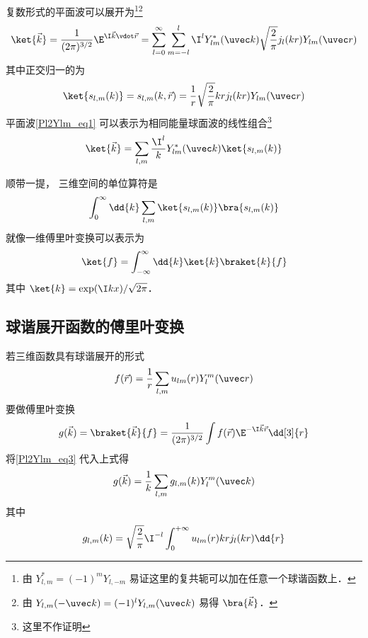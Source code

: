 

复数形式的平面波可以展开为\footnote{由 $Y_{l,m}^* = (-1)^m Y_{l,-m}$ 易证这里的复共轭可以加在任意一个球谐函数上．}\footnote{由 $Y_{l,m}(-\uvec k) = (-1)^l Y_{l,m}(\uvec k)$ 易得 $\bra{\vec k}$．}
\begin{equation}\label{Pl2Ylm_eq1}
\ket{\vec k} = \frac{1}{(2\pi)^{3/2}}\E^{\I \vec k \vdot \vec r} = \sum_{l=0}^{\infty} \sum_{m=-l}^l \I^l Y_{lm}^*(\uvec k) \sqrt{\frac{2}{\pi}} j_l(kr) Y_{lm}(\uvec r)
\end{equation}
其中正交归一的为
\begin{equation}
\ket{s_{l,m}(k)} = s_{l,m}(k,\vec r) = \frac{1}{r}\sqrt{\frac{2}{\pi}}kr j_l(kr) Y_{lm}(\uvec r)
\end{equation}
平面波\autoref{Pl2Ylm_eq1} 可以表示为相同能量球面波的线性组合\footnote{这里不作证明}
\begin{equation}\label{Pl2Ylm_eq3}
\ket{\vec k} = \sum_{l,m}\frac{\I^l}{k} Y_{lm}^*(\uvec k)\ket{s_{l,m}(k)} 
\end{equation}

顺带一提， 三维空间的单位算符是
\begin{equation}
\int_0^\infty \dd{k} \sum_{l,m} \ket{s_{l,m}(k)}\bra{s_{l,m}(k)}
\end{equation}
就像一维傅里叶变换可以表示为%
\begin{equation}
\ket{f} = \int_{-\infty}^{\infty} \dd{k} \ket{k}\braket{k}{f}
\end{equation}
其中 $\ket{k} = \exp(\I kx)/\sqrt{2\pi}$．


\subsection{球谐展开函数的傅里叶变换}

若三维函数具有球谐展开的形式
\begin{equation}
f(\vec r) = \frac{1}{r}\sum_{l,m} u_{lm}(r) Y_l^m(\uvec r)
\end{equation}
要做傅里叶变换
\begin{equation}
g(\vec k) = \braket{\vec k}{f} =  \frac{1}{(2\pi)^{3/2}} \int f(\vec r) \E^{-\I \vec k \vec r} \dd[3]{r}
\end{equation}
将\autoref{Pl2Ylm_eq3} 代入上式得
\begin{equation}
g(\vec k) = \frac{1}{k} \sum_{l,m} g_{l,m}(k)  Y_l^m(\uvec k) 
\end{equation}
其中
\begin{equation}
g_{l,m}(k) = \sqrt{\frac{2}{\pi}} \I^{-l} \int_0^{+\infty} u_{lm}(r) kr j_l(kr) \dd{r}
\end{equation}

